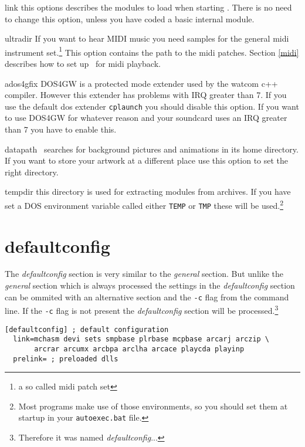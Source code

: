 \begin{dojlist}
\item[link] this options describes the modules to load when starting \cp.
There is no need to change this option, unless you have coded a basic
internal module.
\item[ultradir] If you want to hear MIDI music you need samples for the
general midi instrument set.\footnote{a so called midi patch set} This
option contains the path to the midi patches. Section \ref{midi}
describes how to set up \cp\ for midi playback.
\item[ados4gfix] DOS4GW is a protected mode extender used by the watcom c++
compiler. However this extender has problems with IRQ greater than
7. If you use the default dos extender \texttt{cplaunch} you should
disable this option.  If you want to use DOS4GW for whatever reason
and your soundcard uses an IRQ greater than 7 you have to enable this.
\item[datapath] \cp\ searches for background pictures and animations in its
home directory. If you want to store your artwork at a different place
use this option to set the right directory.
\item[tempdir] this directory is used for extracting modules from archives.
If you have set a DOS environment variable called either \texttt{TEMP}
or
\texttt{TMP} these will be used.\footnote{Most programs make use of those
environments, so you should set them at startup in your
\texttt{autoexec.bat} file.}
\end{dojlist}

\section{defaultconfig}
The \emph{defaultconfig} section is very similar to the \emph{general}
section.  But unlike the \emph{general} section which is always
processed the settings in the \emph{defaultconfig} section can be
ommited with an alternative section and the \texttt{-c} flag from the
command line. If the \texttt{-c} flag is not present the
\emph{defaultconfig} section will be processed.\footnote{Therefore it
was named \emph{defaultconfig}...}

\begin{verbatim}
[defaultconfig] ; default configuration
  link=mchasm devi sets smpbase plrbase mcpbase arcarj arczip \
       arcrar arcumx arcbpa arclha arcace playcda playinp
  prelink= ; preloaded dlls
\end{verbatim}

